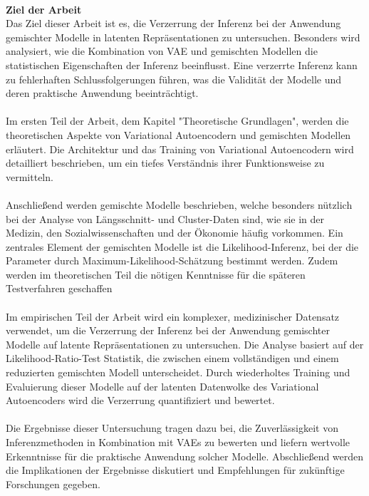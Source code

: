 \documentclass[%
thesis=student,%
coverpage=false,%
titlepage=false,%
headmarks=true, %
german,%
font=libertine, %
math=newpxtx, %
BCOR=5mm,%
coverBCOR=11mm%
]{tumbook}
\theoremstyle{break}
\begin{document}
\\
\textbf{Ziel der Arbeit}\\
Das Ziel dieser Arbeit ist es, die Verzerrung der Inferenz bei der Anwendung gemischter Modelle in latenten Repräsentationen zu untersuchen. Besonders wird analysiert, wie die Kombination von VAE und gemischten Modellen die statistischen Eigenschaften der Inferenz beeinflusst. Eine verzerrte Inferenz kann zu fehlerhaften Schlussfolgerungen führen, was die Validität der Modelle und deren praktische Anwendung beeinträchtigt.\\
\\
Im ersten Teil der Arbeit, dem Kapitel "Theoretische Grundlagen",  werden die theoretischen Aspekte von Variational Autoencodern  und gemischten Modellen erläutert. Die Architektur und das Training von Variational Autoencodern wird detailliert beschrieben, um ein tiefes Verständnis ihrer Funktionsweise zu vermitteln.\\
\\
Anschließend werden gemischte Modelle beschrieben, welche besonders nützlich bei der Analyse von Längsschnitt- und Cluster-Daten sind, wie sie in der Medizin, den Sozialwissenschaften und der Ökonomie häufig vorkommen. Ein zentrales Element der gemischten Modelle ist die Likelihood-Inferenz, bei der die Parameter durch Maximum-Likelihood-Schätzung bestimmt werden. Zudem werden im theoretischen Teil die nötigen Kenntnisse für die späteren Testverfahren geschaffen \\
\\
Im empirischen Teil der Arbeit wird ein komplexer,  medizinischer Datensatz verwendet, um die Verzerrung der Inferenz bei der Anwendung gemischter Modelle auf latente Repräsentationen zu untersuchen. Die Analyse basiert auf der Likelihood-Ratio-Test Statistik, die zwischen einem vollständigen und einem reduzierten gemischten Modell unterscheidet. Durch wiederholtes Training und Evaluierung dieser Modelle auf der latenten Datenwolke des Variational Autoencoders wird die Verzerrung quantifiziert und bewertet.\\
\\
Die Ergebnisse dieser Untersuchung tragen dazu bei, die Zuverlässigkeit von Inferenzmethoden in Kombination mit VAEs zu bewerten und liefern wertvolle Erkenntnisse für die praktische Anwendung solcher Modelle. Abschließend werden die Implikationen der Ergebnisse diskutiert und Empfehlungen für zukünftige Forschungen gegeben.\\
\\
\end{document}
